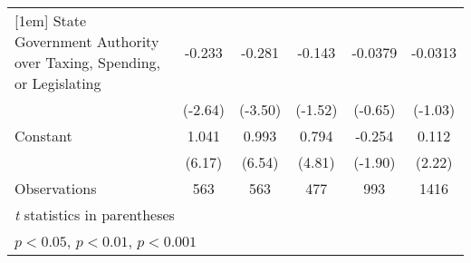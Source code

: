 {\begin{tabular}{l*{5}{c}}
[1em]
State Government Authority over Taxing, Spending, or Legislating&   -0.233\sym{**} &   -0.281\sym{***}&   -0.143         &  -0.0379         &  -0.0313         \\
                &  (-2.64)         &  (-3.50)         &  (-1.52)         &  (-0.65)         &  (-1.03)         \\
[1em]
Constant        &    1.041\sym{***}&    0.993\sym{***}&    0.794\sym{***}&   -0.254         &    0.112\sym{*}  \\
                &   (6.17)         &   (6.54)         &   (4.81)         &  (-1.90)         &   (2.22)         \\
\hline
Observations    &      563         &      563         &      477         &      993         &     1416         \\
\hline\hline
\multicolumn{6}{l}{\footnotesize \textit{t} statistics in parentheses}\\
\multicolumn{6}{l}{\footnotesize \sym{*} \(p<0.05\), \sym{**} \(p<0.01\), \sym{***} \(p<0.001\)}\\
\end{tabular}
}
